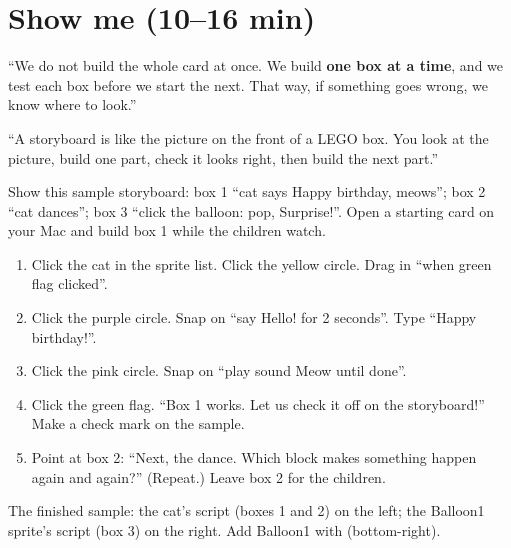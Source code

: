 \section{Show me (10--16 min)}
\begin{teacherscript}
\enquote{We do not build the whole card at once. We build \textbf{one box at a time}, and we test each box before we start the next. That way, if something goes wrong, we know where to look.}
\end{teacherscript}

\begin{analogy}
\enquote{A storyboard is like the picture on the front of a LEGO box. You look at the picture, build one part, check it looks right, then build the next part.}
\end{analogy}

\begin{workedexample}
Show this sample storyboard: box 1 \enquote{cat says Happy birthday, meows}; box 2 \enquote{cat dances}; box 3 \enquote{click the balloon: pop, Surprise!}. Open a starting card on your Mac and build box 1 while the children watch.
\begin{enumerate}[leftmargin=1.4em,itemsep=1pt]
  \item Click the cat in the sprite list. Click the yellow  circle. Drag in \enquote{when green flag clicked}.
  \item Click the purple  circle. Snap on \enquote{say Hello! for 2 seconds}. Type \enquote{Happy birthday!}.
  \item Click the pink  circle. Snap on \enquote{play sound Meow until done}.
  \item Click the green flag. \enquote{Box 1 works. Let us check it off on the storyboard!} Make a check mark on the sample.
  \item Point at box 2: \enquote{Next, the dance. Which block makes something happen again and again?} (Repeat.) Leave box 2 for the children.
\end{enumerate}
\begin{center}
\begin{scratch}[scale=0.85]
\end{scratch}
\quad
\begin{scratch}[scale=0.85]
\end{scratch}
\end{center}
The finished sample: the cat's script (boxes 1 and 2) on the left; the Balloon1 sprite's script (box 3) on the right. Add Balloon1 with  (bottom-right).
\end{workedexample}

